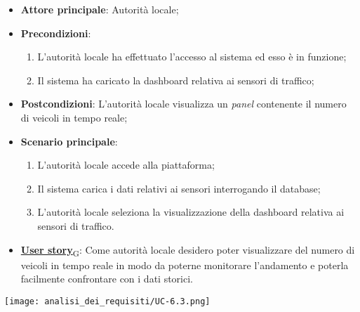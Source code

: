 \begin{itemize}
	\item \textbf{Attore principale}: Autorità locale;
	\item \textbf{Precondizioni}:
	      \begin{enumerate}
		      \item L'autorità locale ha effettuato l'accesso al sistema ed esso è in funzione;
		      \item Il sistema ha caricato la dashboard relativa ai sensori di traffico;
	      \end{enumerate}
	\item \textbf{Postcondizioni}: L'autorità locale visualizza un \textit{panel} contenente il numero di veicoli in tempo reale;
	\item \textbf{Scenario principale}:
	      \begin{enumerate}
		      \item L'autorità locale accede alla piattaforma;
		      \item Il sistema carica i dati relativi ai sensori interrogando il database;
		      \item L'autorità locale seleziona la visualizzazione della dashboard relativa ai sensori di traffico.
	      \end{enumerate}
	\item \href{https://7last.github.io/docs/rtb/documentazione-interna/glossario\#user-story}{\textbf{User story}\textsubscript{G}}:
	      Come autorità locale desidero poter visualizzare del numero di veicoli in tempo reale in modo da poterne monitorare l'andamento
	      e poterla facilmente confrontare con i dati storici.
\end{itemize}
\begin{center}
	\texttt{[image: analisi\_dei\_requisiti/UC-6.3.png]}
\end{center}

